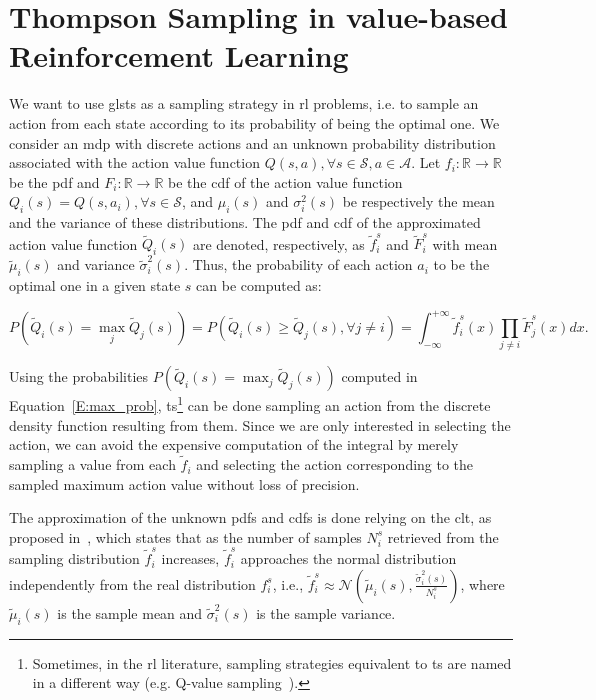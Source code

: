 \section{Thompson Sampling in value-based Reinforcement Learning}\label{S:tsrl}
We want to use gls{ts} as a sampling strategy in \gls{rl} problems, i.e. to sample an action from each state according to its probability of being the optimal one.
We consider an \gls{mdp} with discrete actions and an unknown probability distribution associated with the action value function $Q(s,a), \forall s \in \mathcal{S}, a \in \mathcal{A}$. Let $f_i:\mathbb{R} \rightarrow \mathbb{R}$ be the \gls{pdf} and $F_i:\mathbb{R} \rightarrow \mathbb{R}$ be the \gls{cdf} of the action value function $Q_i(s) = Q(s, a_i), \forall s \in \mathcal{S}$, and $\mu_i(s)$ and $\sigma^2_i(s)$ be respectively the mean and the variance of these distributions. The \gls{pdf} and \gls{cdf} of the approximated action value function $\tilde{Q}_i(s)$ are denoted, respectively, as $\tilde{f}_i^s$ and $\tilde{F}_i^s$ with mean $\tilde{\mu}_i(s)$ and variance $\tilde{\sigma}_i^2(s)$. Thus, the probability of each action $a_i$ to be the optimal one in a given state $s$ can be computed as:

\begin{equation}\label{E:max_prob}
 P\left(\tilde{Q}_i(s) = \max_j \tilde{Q}_j(s)\right) = P\left(\tilde{Q}_i(s) \geq \tilde{Q}_j(s), \forall j \neq i\right) = \int^{+\infty}_{-\infty} \tilde{f}_i^s(x) \prod_{j \neq i} \tilde{F}_j^s(x) dx.
\end{equation}

Using the probabilities $P\left(\tilde{Q}_i(s) = \max_j \tilde{Q}_j(s)\right)$ computed in Equation~\ref{E:max_prob}, \gls{ts}\footnote{Sometimes, in the \gls{rl} literature, sampling strategies equivalent to \gls{ts} are named in a different way (e.g. Q-value sampling~\cite{dearden1998bayesian}).} can be done sampling an action from the discrete density function resulting from them. Since we are only interested in selecting the action, we can avoid the expensive computation of the integral by merely sampling a value from each $\tilde{f}_i$ and selecting the action corresponding to the sampled maximum action value without loss of precision.

The approximation of the unknown \glspl{pdf} and \glspl{cdf} is done relying on the \gls{clt}, as proposed in~\cite{deramo2016estimating}, which states that as the number of samples $N_i^s$ retrieved from the sampling distribution $\tilde{f}_i^s$ increases, $\tilde{f}_i^s$ approaches the normal distribution independently from the real distribution $f_i^s$, i.e., $\tilde{f}_i^s \approx \mathcal{N}\left(\tilde{\mu}_i(s), \frac{\tilde{\sigma}^2_i(s)}{N_i^s}\right)$, where $\tilde{\mu}_i(s)$ is the sample mean and $\tilde{\sigma}^2_i(s)$ is the sample variance. 

